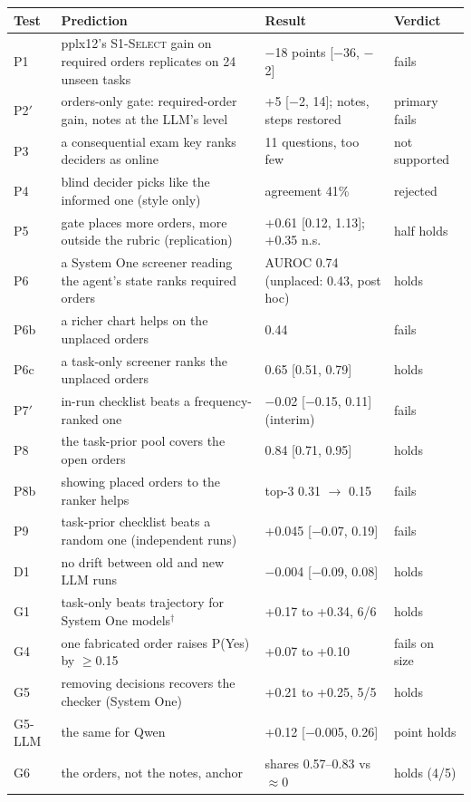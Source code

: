 \documentclass[11pt]{article}
\newcommand{\sel}{\textsc{S1-Select}}
\begin{document}
\begin{table}[t]
\centering\small
\begin{tabular}{@{}p{}p{}p{}l@{}}\toprule
Test & Prediction & Result & Verdict \\\midrule
P1 & pplx12's \sel{} gain on required orders replicates on 24 unseen tasks & $-$18 points [$-$36, $-$2] & fails \\
P2$'$ & orders-only gate: required-order gain, notes at the LLM's level & +5 [$-$2, 14]; notes, steps restored & primary fails \\
P3 & a consequential exam key ranks deciders as online & 11 questions, too few & not supported \\
P4 & blind decider picks like the informed one (style only) & agreement 41\% & rejected \\
P5 & gate places more orders, more outside the rubric (replication) & +0.61 [0.12, 1.13]; +0.35 n.s. & half holds \\
P6 & a System One screener reading the agent's state ranks required orders & AUROC 0.74 (unplaced: 0.43, post hoc) & holds \\
P6b & a richer chart helps on the unplaced orders & 0.44 & fails \\
P6c & a task-only screener ranks the unplaced orders & 0.65 [0.51, 0.79] & holds \\
P7$'$ & in-run checklist beats a frequency-ranked one & $-$0.02 [$-$0.15, 0.11] (interim) & fails \\
P8 & the task-prior pool covers the open orders & 0.84 [0.71, 0.95] & holds \\
P8b & showing placed orders to the ranker helps & top-3 0.31 $\to$ 0.15 & fails \\
P9 & task-prior checklist beats a random one (independent runs) & +0.045 [$-$0.07, 0.19] & fails \\
D1 & no drift between old and new LLM runs & $-$0.004 [$-$0.09, 0.08] & holds \\
G1 & task-only beats trajectory for System One models$^\dagger$ & +0.17 to +0.34, 6/6 & holds \\
G4 & one fabricated order raises P(Yes) by $\ge$0.15 & +0.07 to +0.10 & fails on size \\
G5 & removing decisions recovers the checker (System One) & +0.21 to +0.25, 5/5 & holds \\
G5-LLM & the same for Qwen & +0.12 [$-$0.005, 0.26] & point holds \\
G6 & the orders, not the notes, anchor & shares 0.57--0.83 vs $\approx$0 & holds (4/5) \\

\end{tabular}
\end{table}
\end{document}
